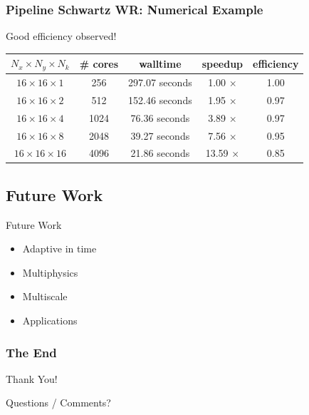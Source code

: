 \documentclass{beamer}
\begin{document}
\begin{frame}
  \frametitle{Pipeline Schwartz WR: Numerical Example}
  Good efficiency observed!
  \begin{center}
    \begin{tabular}{c|c|c|c|c}
      $N_x \times N_y \times N_k$ &
      \# cores & walltime & speedup & efficiency\\
      \hline
      $16 \times 16 \times 1 $&
      256  & 297.07 seconds & 1.00 $\times$  & 1.00 \\
      $16 \times 16 \times 2 $&
      512  & 152.46 seconds & 1.95 $\times$ & 0.97 \\
      $16 \times 16 \times 4 $&
      1024 & 76.36 seconds &  3.89 $\times$ & 0.97 \\
      $16 \times 16 \times 8 $&
      2048 & 39.27 seconds  & 7.56 $\times$ & 0.95 \\
      $16 \times 16 \times 16 $&
      4096 & 21.86 seconds  & 13.59 $\times$ & 0.85 \\
    \end{tabular}
  \end{center}

\end{frame}


\subsection{Future Work}

\begin{frame}{Future Work}

  \begin{itemize}
  \item Adaptive in time
  \item Multiphysics
  \item Multiscale
  \item Applications
  \end{itemize}

\end{frame}

\begin{frame}
  \frametitle{The End}
  \begin{center}
    Thank You!

    Questions / Comments?
  \end{center}
\end{frame}
\end{document}

